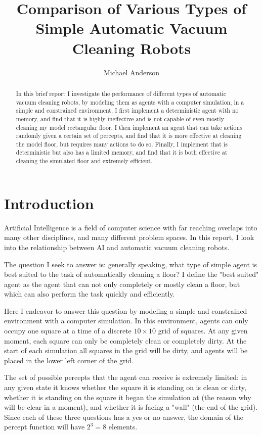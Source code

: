 \documentclass[10 pt.]{article}
\author{Michael Anderson}
\title{Comparison of Various Types of Simple Automatic Vacuum Cleaning Robots}
\begin{document}
\maketitle
\begin{abstract}
In this brief report I investigate the performance of different types of
automatic vacuum cleaning robots, by modeling them as agents with a computer simulation,
in a simple and constrained environment. I first implement a deterministic agent
with no memory, and find that it is highly ineffective and is not capable of
even mostly cleaning my model
rectangular floor. I then implement an agent that can take actions randomly
given a certain set of percepts, and find that it is more effective at cleaning
the model floor, but requires many actions to do so.
Finally, I implement that is deterministic but also has a limited memory,
and find that it is both effective at cleaning the simulated floor and extremely
efficient.
\end{abstract}
\tableofcontents
\newpage
\section{Introduction}
Artificial Intelligence is a field of computer science with far reaching overlaps
into many other disciplines, and many different problem spaces. In this report, I
look into the relationship between AI and automatic vacuum cleaning robots.

The question I seek to answer is: generally speaking, what type of simple agent is
best suited to the task of automatically cleaning a floor? I define the "best suited"
agent as the agent that can not only completely or mostly clean a floor, but which
can also perform the task quickly and efficiently.

Here I endeavor to answer this question by modeling a simple and constrained
environment with a computer simulation. In this environment, agents can only occupy
one square at a time of a discrete $10 \times 10$ grid of squares. At any given moment,
each square can only be completely clean or completely dirty. At the start of each simulation all squares in the grid will be dirty,
and agents will be placed in the lower left corner of the grid.

The set of possible
percepts that the agent can receive is extremely limited: in any given state it knows
whether the square it is standing on is clean or dirty, whether it is standing on the
square it began the simulation at (the reason why will be clear in a moment), and whether
it is facing a "wall" (the end of the grid). Since each of these three questions has a yes or
no answer, the domain of the percept function will have $2^3 = 8$ elements.
\end{document}
